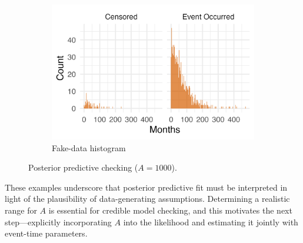 \begin{figure}[H]
\begin{subfigure}[t]{0.37\textwidth}
  \includegraphics[width=\linewidth]{images/fake_duration_hist_a1000.png}   %
  \caption{{\small Fake-data histogram}}
  \label{fig:fake-hist_a1000}
\end{subfigure}
\caption{{\small Posterior predictive checking ($A=1000$).}}
\label{fig:ppc-A1000}
\end{figure}
These examples underscore that posterior predictive fit must be interpreted in light of the plausibility of data-generating assumptions. Determining a realistic range for $A$ is essential for credible model checking, and this motivates the next step—explicitly incorporating $A$ into the likelihood and estimating it jointly with event-time parameters.